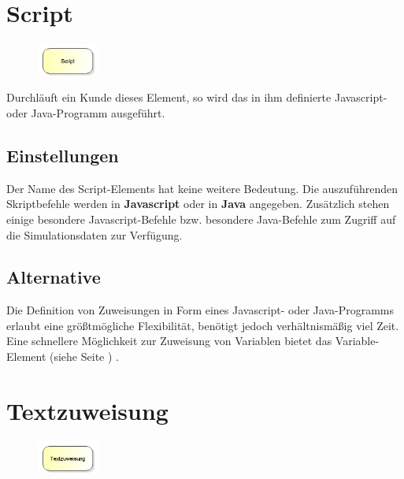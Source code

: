 \section{Script}
\label{ref:ModelElementSetJS}

\begin{figure}
\vspace{-22pt}
\includegraphics[width=2cm]{imageModelElementSetJS.png}
\vspace{-22pt}
\end{figure}

Durchläuft ein Kunde dieses Element, so wird das in ihm definierte Javascript- oder Java-Programm ausgeführt.

\subsection*{Einstellungen}

Der Name des Script-Elements hat keine weitere Bedeutung. Die auszuführenden Skriptbefehle werden in
\textbf{Javascript} oder in \textbf{Java} angegeben. Zusätzlich stehen einige
besondere Javascript-Befehle bzw. besondere Java-Befehle 
zum Zugriff auf die Simulationsdaten zur Verfügung.

\subsection*{Alternative}

Die Definition von Zuweisungen in Form eines Javascript- oder Java-Programms erlaubt eine größtmögliche Flexibilität,
benötigt jedoch verhältnismäßig viel Zeit. Eine schnellere Möglichkeit zur Zuweisung von Variablen
bietet das Variable-Element (siehe Seite \pageref{ref:ModelElementSet}) .


\section{Textzuweisung}
\label{ref:ModelElementAssignString}

\begin{figure}
\vspace{-22pt}
\includegraphics[width=2cm]{imageModelElementAssignString.png}
\vspace{-22pt}
\end{figure}

